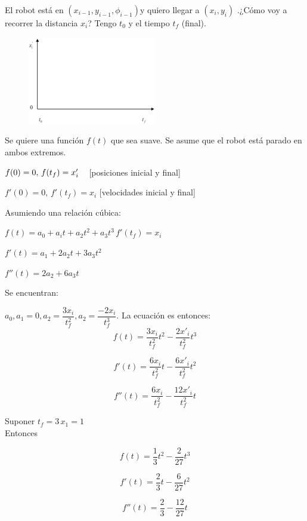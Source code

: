 El robot está en $(x_{i-1},y_{i-1},\phi_{i-1}) $y quiero llegar a $(x_i,y_i)$ .¿Cómo voy a recorrer la distancia $x_i$?
Tengo $t_0$ y el tiempo $t_f$ (final).


\begin{figure}[h!]
	\centering
	\includegraphics[width=0.5\textwidth]{images/img65.png}
	\label{figura65}
\end{figure}


Se quiere una función $f(t)$ que sea suave. Se asume que el robot está parado en ambos extremos.

$f(0)=0, \, f(t_f)= x_i' \hspace{0.3cm}$ [posiciones inicial y final]

$f'(0)=0, \, f'(t_f)= x_i $ \hspace{0.3cm}[velocidades inicial y final]


Asumiendo una relación cúbica:

$f(t)=a_0 +a_it + a_2 t^2 + a_3 t^3 \, f'(t_f)= x_i$

$f'(t)=a_1 + 2a_2t + 3a_3 t^2$

$f''(t)=2a_2 + 6a_3t$

Se encuentran:

$a_0, a_1=0, a_2=\dfrac{3x_i}{t_f^2},a_2=\dfrac{-2x_i}{t_f^3}$. La ecuación es entonces:
$$
f(t)=\dfrac{3x_i}{t_{f}^2}t^2 - \dfrac{2x'_{i}}{t_{f}^2} t^3
$$

$$
f'(t)=\dfrac{6x_i}{t_{f}^2}t -  \dfrac{6x'_{i}}{t_{f}^2} t^2
$$

$$
f''(t)=\dfrac{6x_i}{t_{f}^2}- \dfrac{12x'_{i}}{t_{f}^2} t
$$

\begin{ejemplo}
	
	
	Suponer $ t_f = 3 \,  x_1=1$ \\
	Entonces
	
	$$f(t)=\dfrac{1}{3}t^2 - \dfrac{2}{27}t^3
	$$
	
	$$f'(t)=\dfrac{2}{3}t - \dfrac{6}{27}t^2$$
	
	$$f''(t)=\dfrac{2}{3} - \dfrac{12}{27}t$$
	
\end{ejemplo}


